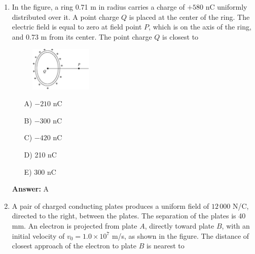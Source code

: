\begin{enumerate}
    \begin{multicols}{4}
    \begin{itemize}
        \item[A)] $(-3.6\times10^3\text{ N/C})\hat\imath$
        \item[B)] $(1.8\times10^3\text{ N/C})\hat \jmath$
        \item[C)] $(-1.8\times10^3\text{ N/C})\hat k$
        \item[D)] $(3.6\times10^3\text{ N/C})\hat\imath$
        \item[E)] Zero
    \end{itemize}
    \end{multicols}
    

    \textbf{Answer:} D

    \item In the figure, a ring 0.71 m in radius carries a charge of $+580$ nC uniformly distributed over it. A point charge $Q$ is placed at the center of the ring. The electric field is equal to zero at field point $P$, which is on the axis of the ring, and 0.73 m from its center. The point charge $Q$ is closest to

    \begin{figure}[H]
        \centering
        \includegraphics[width=0.28\textwidth]{figures-workshop01/problem-12.png}
    \end{figure}

    \begin{multicols}{5}
    \begin{itemize}
        \item[A)] $-210$ nC
        \item[B)] $-300$ nC
        \item[C)] $-420$ nC
        \item[D)] 210 nC
        \item[E)] 300 nC
    \end{itemize}
    \end{multicols}

    \textbf{Answer:} A

    \item A pair of charged conducting plates produces a uniform field of $12\,000$ N/C, directed to the right, between the plates. The separation of the plates is 40 mm. An electron is projected from plate $A$, directly toward plate $B$, with an initial velocity of $v_0=1.0\times10^7$ m/s, as shown in the figure. The distance of closest approach of the electron to plate $B$ is nearest to


\end{enumerate}
